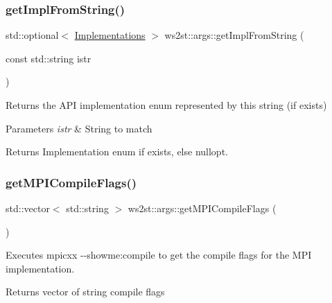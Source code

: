 \subsubsection{\texorpdfstring{get\+Impl\+From\+String()}{getImplFromString()}}
{\footnotesize\ttfamily std\+::optional$<$ \mbox{\hyperlink{common_8hpp_aad9d1428f17c06ff77ef15dea22624dc}{Implementations}} $>$ ws2st\+::args\+::get\+Impl\+From\+String (\begin{DoxyParamCaption}\item[{const std\+::string}]{istr }\end{DoxyParamCaption})}



Returns the A\+PI implementation enum represented by this string (if exists) 


\begin{DoxyParams}{Parameters}
{\em istr} & String to match \\
\hline
\end{DoxyParams}
\begin{DoxyReturn}{Returns}
Implementation enum if exists, else nullopt. 
\end{DoxyReturn}
\mbox{\label{namespacews2st_1_1args_ae17df12fe1f69d9bb38d427398bc5ce8}} 
\subsubsection{\texorpdfstring{get\+M\+P\+I\+Compile\+Flags()}{getMPICompileFlags()}}
{\footnotesize\ttfamily std\+::vector$<$ std\+::string $>$ ws2st\+::args\+::get\+M\+P\+I\+Compile\+Flags (\begin{DoxyParamCaption}{ }\end{DoxyParamCaption})}



Executes {\ttfamily mpicxx -\/-\/showme\+:compile} to get the compile flags for the M\+PI implementation. 

\begin{DoxyReturn}{Returns}
vector of string compile flags 
\end{DoxyReturn}
\mbox{\label{namespacews2st_1_1args_af89364224123958495fbf930ea918e7e}} 
